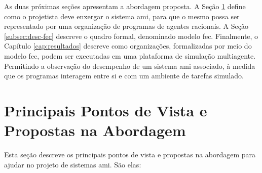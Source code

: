     As duas próximas seções apresentam a abordagem proposta. A Seção \ref{sec:pontos-propostas} define como o projetista deve enxergar o sistema \acrshort{ami}, para que o mesmo possa ser representado por uma organização de programas de agentes racionais. A Seção \ref{subsec:desc-fec} descreve o quadro formal, denominado modelo \acrshort{fec}. Finalmente, o Capítulo \ref{cap:resultados} descreve como organizações, formalizadas por meio do modelo \acrshort{fec}, podem ser executadas em uma plataforma de simulação multiagente. Permitindo a observação do desempenho de um sistema \acrshort{ami} associado, à medida que os programas interagem entre si e com um ambiente de tarefas simulado.
    
\section{Principais Pontos de Vista e Propostas na Abordagem}
\label{sec:pontos-propostas}

Esta seção descreve os principais pontos de vista e propostas na abordagem para ajudar no projeto de sistemas \acrshort{ami}. São elas: 

